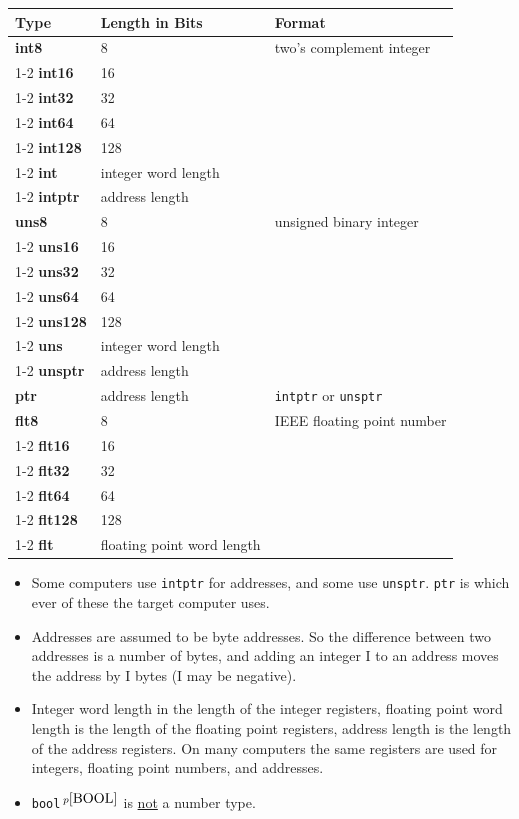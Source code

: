 \documentclass[12pt]{article}
\newcommand{\key}[1]{{\rm \bfseries #1}}
\newcommand{\pagnote}[1]{$\,^{p\pageref{#1}}$}
\begin{document}
\begin{center}
\begin{tabular}{|l|l|l|}
\hline
\bf Type & \bf Length in Bits & \bf Format \\
\hline
\key{int8}	&  8 & two's complement integer \\
\cline{1-2}
\key{int16}	&  16 & \\
\cline{1-2}
\key{int32}	&  32 & \\
\cline{1-2}
\key{int64}	&  64 & \\
\cline{1-2}
\key{int128}	& 128 & \\
\cline{1-2}
\key{int}	& integer word length & \\
\cline{1-2}
\key{intptr}	& address length & \\
\hline
\key{uns8}	&  8 & unsigned binary integer \\
\cline{1-2}
\key{uns16}	&  16 & \\
\cline{1-2}
\key{uns32}	&  32 & \\
\cline{1-2}
\key{uns64}	&  64 & \\
\cline{1-2}
\key{uns128}	& 128 & \\
\cline{1-2}
\key{uns}	& integer word length & \\
\cline{1-2}
\key{unsptr}	& address length & \\
\hline
\key{ptr}	& address length & {\tt intptr} or {\tt unsptr} \\
\hline
\key{flt8}	&  8 & IEEE floating point number \\
\cline{1-2}
\key{flt16}	&  16 & \\
\cline{1-2}
\key{flt32}	&  32 & \\
\cline{1-2}
\key{flt64}	&  64 & \\
\cline{1-2}
\key{flt128}	& 128 & \\
\cline{1-2}
\key{flt}	& floating point word length & \\
\hline
\end{tabular}
\end{center}

\begin{itemize}
\item Some computers use {\tt intptr} for addresses, and some
use {\tt unsptr}.  {\tt ptr} is which ever of these the target
computer uses.
\item
Addresses are assumed to be byte addresses.  So the difference
between two addresses is a number of bytes, and adding an integer I
to an address moves the address by I bytes (I may be negative).
\item Integer word length in the length of the integer registers,
floating point word length is the length of the floating point
registers, address length is the length of the address registers.
On many computers the same registers are used for integers,
floating point numbers, and addresses.
\item {\tt bool}\pagnote{BOOL} is \underline{not} a number type.
\end{itemize}
\end{document}
